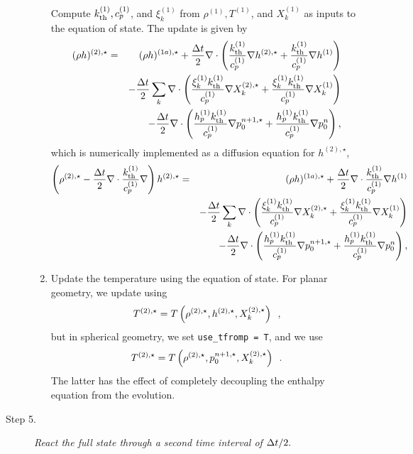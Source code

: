 \begin{description}
\begin{enumerate}
Compute $k_{\rm th}^{(1)}, c_p^{(1)}$, and $\xi_k^{(1)}$ from $\rho^{(1)}, T^{(1)}$, and $X_k^{(1)}$ as inputs to the equation of state.  The update is given by
\begin{eqnarray}
(\rho h)^{(2),\star} &=& (\rho h)^{(1a),\star} + \frac{\Delta t}{2}\nabla\cdot\left(\frac{k_{\rm th}^{(1)}}{c_p^{(1)}}\nabla h^{(2),\star} + \frac{k_{\rm th}^{(1)}}{c_p^{(1)}}\nabla h^{(1)}\right)\nonumber\\
&&- \frac{\Delta t}{2}\sum_k\nabla\cdot\left(\frac{\xi_k^{(1)}k_{\rm th}^{(1)}}{c_p^{(1)}}\nabla X_k^{(2),\star} + \frac{\xi_k^{(1)}k_{\rm th}^{(1)}}{c_p^{(1)}}\nabla X_k^{(1)}\right)\nonumber\\
&&- \frac{\Delta t}{2}\nabla\cdot\left(\frac{h_p^{(1)}k_{\rm th}^{(1)}}{c_p^{(1)}}\nabla p_0^{n+1,\star} + \frac{h_p^{(1)}k_{\rm th}^{(1)}}{c_p^{(1)}}\nabla p_0^{n}\right),
\end{eqnarray}
which is numerically implemented as a diffusion equation for $h^{(2),\star}$,
\begin{eqnarray}
\left(\rho^{(2),\star} - \frac{\Delta t}{2}\nabla\cdot\frac{k_{\rm th}^{(1)}}{c_p^{(1)}}\nabla\right)h^{(2),\star} &=& (\rho h)^{(1a),\star} + \frac{\Delta t}{2}\nabla\cdot\frac{k_{\rm th}^{(1)}}{c_p^{(1)}}\nabla h^{(1)}\nonumber\\
&&- \frac{\Delta t}{2}\sum_k\nabla\cdot\left(\frac{\xi_k^{(1)}k_{\rm th}^{(1)}}{c_p^{(1)}}\nabla X_k^{(2),\star} + \frac{\xi_k^{(1)}k_{\rm th}^{(1)}}{c_p^{(1)}}\nabla X_k^{(1)}\right)\nonumber\\
&&- \frac{\Delta t}{2}\nabla\cdot\left(\frac{h_p^{(1)}k_{\rm th}^{(1)}}{c_p^{(1)}}\nabla p_0^{n+1,\star} + \frac{h_p^{(1)}k_{\rm th}^{(1)}}{c_p^{(1)}}\nabla p_0^{n}\right),
\end{eqnarray}
\item Update the temperature using the equation of state.  For planar geometry,
we update using
\begin{equation}
T^{(2),\star} = T\left(\rho^{(2),\star}, h^{(2),\star}, X_k^{(2),\star}\right) \enskip ,
\end{equation}
but in spherical geometry, we set {\tt use\_tfromp = T}, and we use
\begin{equation}
T^{(2),\star} = T\left(\rho^{(2),\star}, p_0^{n+1,\star}, X_k^{(2),\star}\right) \enskip .
\end{equation}
The latter has the effect of completely decoupling the enthalpy equation from the 
evolution.

\end{enumerate}

\item[Step 5.] {\em React the full state through a second time interval of $\Delta t / 2.$}


\end{description}
